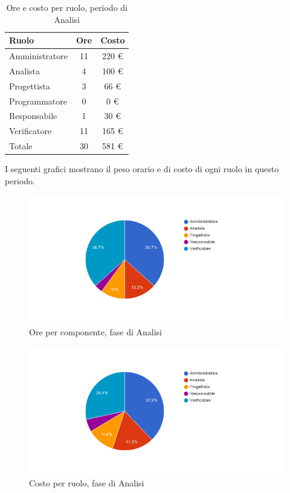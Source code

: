 \begin{table}[H]
	\centering
	\begin{tabular}{ l c c }
		\textbf{Ruolo} & \textbf{Ore} & \textbf{Costo} \\
		\hline
		Amministratore & 11 & 220 \euro{} \\
		Analista & 4 & 100 \euro{} \\
		Progettista & 3 & 66 \euro{} \\
		Programmatore & 0 & 0 \euro{} \\
		Responsabile & 1 & 30 \euro{} \\
		Verificatore & 11 & 165 \euro{} \\
		\hline
		Totale & 30 & 581 \euro{} \\
		\hline
	\end{tabular}
	\caption{Ore e costo per ruolo, periodo di Analisi}
\end{table}

I seguenti grafici mostrano il peso orario e di costo di ogni ruolo in questo periodo.

\begin{figure}[H]
  \begin{center}
    \includegraphics[width=15cm]{res/img/prospettoEconomico/orePerRuoloAnalisiMiglioramenti.png}
  \caption{Ore per componente, fase di Analisi}
  \end{center} 
\end{figure}  

\begin{figure}[H]
  \begin{center}
    \includegraphics[width=15cm]{res/img/prospettoEconomico/costoPerRuoloAnalisiMiglioramenti.png}
  \caption{Costo per ruolo, fase di Analisi}
  \end{center} 
\end{figure}  


